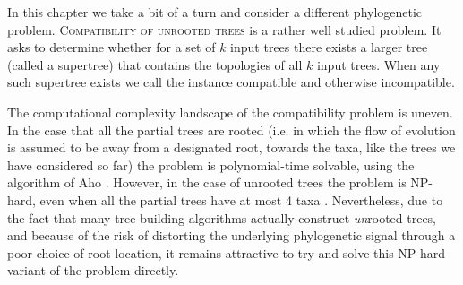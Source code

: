 






In this chapter we take a bit of a turn and consider a different phylogenetic problem. \textsc{Compatibility of unrooted trees} is a rather well studied problem. It asks to determine whether for a set of $k$ input trees there exists a larger tree (called a supertree) that contains the topologies of all $k$ input trees. When any such supertree exists we call the instance compatible and otherwise incompatible. 

The computational complexity landscape of the compatibility problem is uneven. In the case that all the partial trees are rooted (i.e. in which the flow of evolution is assumed to be away from a designated root, towards the taxa, like the trees we have considered so far) the problem is polynomial-time solvable, using the algorithm of Aho \cite{Aho81}. However, in the case of unrooted trees the problem is NP-hard, even when all the partial trees have at most 4 taxa \cite{Steel92}. Nevertheless, due to the fact that many tree-building algorithms actually construct \emph{un}rooted trees, and because of the risk of distorting the underlying phylogenetic signal through a poor choice of root location, it remains attractive to try and solve this NP-hard variant of the problem directly.

